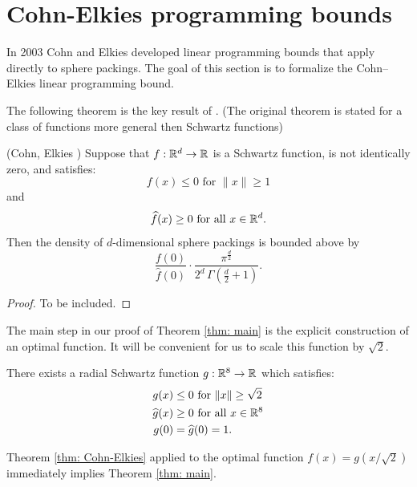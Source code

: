 \section{Cohn-Elkies programming bounds}

In 2003 Cohn and Elkies \cite{ElkiesCohn}  developed  linear programming bounds that apply directly to sphere packings. The goal of this section is to formalize the Cohn--Elkies linear programming bound.

The following theorem is the key result of \cite{ElkiesCohn}. (The original theorem is stated for a   class of functions more general then Schwartz functions)
\begin{theorem}\label{thm: Cohn-Elkies}
(Cohn, Elkies \cite{ElkiesCohn}) Suppose that  $f:\mathbb{R}^d\to\mathbb{R}$ is a Schwartz function, is not identically zero, and satisfies:
\begin{equation}\label{eqn: Cohn-Elkies condition 1}f(x)\leq 0\mbox{ for } \|x\|\geq 1\end{equation} and
\begin{equation}\label{eqn: Cohn-Elkies condition 2}\widehat{f}(x)\geq0\mbox{ for all } x\in\mathbb{R}^d.\end{equation}
  Then the  density of  $d$-dimensional
  sphere packings is bounded above by $$\frac{f(0)}{\widehat{f}(0)}\cdot \frac{\pi^{\frac{d}{2}}}{2^d\,\Gamma(\textstyle \frac{d}{2}+1)}.$$
\end{theorem}
\begin{proof}
To be included.
\end{proof}


  The main step in our proof of Theorem \ref{thm: main} is the explicit  construction of an optimal function. It will be convenient for us to scale this function by $\sqrt{2}$.
\begin{theorem}\label{thm: g}
There exists a radial Schwartz function $g:\mathbb{R}^8\to\mathbb{R}$ which satisfies:
\begin{align}
g(x)&\leq 0\mbox{ for } \|x\|\geq \sqrt{2} \label{eqn: g1}\\
\widehat{g}(x)&\geq0\mbox{ for all } x\in\mathbb{R}^8\label{eqn: g2}\\
g(0)&=\widehat{g}(0)=1.\label{eqn: g3}
\end{align}
\end{theorem}
Theorem \ref{thm: Cohn-Elkies} applied to the optimal function $f(x)=g(x/\sqrt{2})$ immediately implies Theorem \ref{thm: main}.


